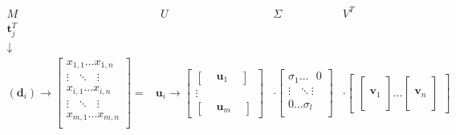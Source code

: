 $$
\begin{matrix} 
 M &  ~~ U & \Sigma & V^T \\
 \textbf{t}_j^T &  & &  \\
 \downarrow &  & &  \\
(\textbf{d}_i) \rightarrow 
\begin{bmatrix}
x_{1,1} \dots  x_{1,n} \\
\vdots ~~~  \ddots ~~~ \vdots \\
x_{i,1} \dots  x_{i,n} \\
\vdots ~~~ \ddots ~~~ \vdots \\
x_{m,1} \dots  x_{m,n} \\
\end{bmatrix}
=
&
\textbf{u}_i \rightarrow
\begin{bmatrix} 
\begin{bmatrix} & \textbf{u}_1 & \end{bmatrix} \\
\vdots \\
\begin{bmatrix} & \textbf{u}_m & \end{bmatrix}
\end{bmatrix}
&
\cdot
\begin{bmatrix} 
\sigma_1 \dots ~~~ 0 \\
\vdots ~~~ \ddots  \vdots \\
0  \dots  \sigma_l \\
\end{bmatrix}
&
\cdot
\begin{bmatrix} 
\begin{bmatrix} \, \\ \, \\ \textbf{v}_1 \\ \, \\ \,\end{bmatrix} 
\dots
\begin{bmatrix} \, \\ \, \\ \textbf{v}_n \\ \, \\ \, \end{bmatrix}
\end{bmatrix}
\end{matrix}
$$